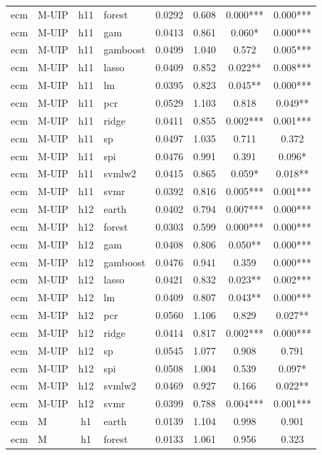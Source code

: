 \begin{ThreePartTable}
\begin{longtable}[t]{llclcccc}
ecm & M-UIP & h11 & forest & 0.0292 & 0.608 & 0.000*** & 0.000***\\
ecm & M-UIP & h11 & gam & 0.0413 & 0.861 & 0.060* & 0.000***\\
ecm & M-UIP & h11 & gamboost & 0.0499 & 1.040 & 0.572 & 0.005***\\
ecm & M-UIP & h11 & lasso & 0.0409 & 0.852 & 0.022** & 0.008***\\
ecm & M-UIP & h11 & lm & 0.0395 & 0.823 & 0.045** & 0.000***\\
ecm & M-UIP & h11 & pcr & 0.0529 & 1.103 & 0.818 & 0.049**\\
ecm & M-UIP & h11 & ridge & 0.0411 & 0.855 & 0.002*** & 0.001***\\
ecm & M-UIP & h11 & sp & 0.0497 & 1.035 & 0.711 & 0.372\\
ecm & M-UIP & h11 & spi & 0.0476 & 0.991 & 0.391 & 0.096*\\
ecm & M-UIP & h11 & svmlw2 & 0.0415 & 0.865 & 0.059* & 0.018**\\
ecm & M-UIP & h11 & svmr & 0.0392 & 0.816 & 0.005*** & 0.001***\\
\addlinespace
ecm & M-UIP & h12 & earth & 0.0402 & 0.794 & 0.007*** & 0.000***\\
ecm & M-UIP & h12 & forest & 0.0303 & 0.599 & 0.000*** & 0.000***\\
ecm & M-UIP & h12 & gam & 0.0408 & 0.806 & 0.050** & 0.000***\\
ecm & M-UIP & h12 & gamboost & 0.0476 & 0.941 & 0.359 & 0.000***\\
ecm & M-UIP & h12 & lasso & 0.0421 & 0.832 & 0.023** & 0.002***\\
ecm & M-UIP & h12 & lm & 0.0409 & 0.807 & 0.043** & 0.000***\\
ecm & M-UIP & h12 & pcr & 0.0560 & 1.106 & 0.829 & 0.027**\\
ecm & M-UIP & h12 & ridge & 0.0414 & 0.817 & 0.002*** & 0.000***\\
ecm & M-UIP & h12 & sp & 0.0545 & 1.077 & 0.908 & 0.791\\
ecm & M-UIP & h12 & spi & 0.0508 & 1.004 & 0.539 & 0.097*\\
ecm & M-UIP & h12 & svmlw2 & 0.0469 & 0.927 & 0.166 & 0.022**\\
ecm & M-UIP & h12 & svmr & 0.0399 & 0.788 & 0.004*** & 0.001***\\
\addlinespace
ecm & M & h1 & earth & 0.0139 & 1.104 & 0.998 & 0.901\\
ecm & M & h1 & forest & 0.0133 & 1.061 & 0.956 & 0.323\\

\end{longtable}
\end{ThreePartTable}
